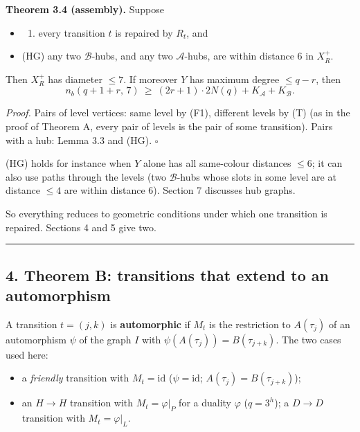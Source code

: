 \documentclass[
  11pt,
]{article}
\providecommand{\tightlist}{%
  \setlength{\itemsep}{0pt}\setlength{\parskip}{0pt}}
\begin{document}
\textbf{Theorem 3.4 (assembly).} Suppose

\begin{itemize}
\item
  \begin{enumerate}
  \def\labelenumi{(\Alph{enumi})}
  \setcounter{enumi}{19}
  \tightlist
  \item
    every transition \(t\) is repaired by \(R_t\), and
  \end{enumerate}
\item
  (HG) any two \(\mathcal B\)-hubs, and any two \(\mathcal A\)-hubs, are within distance 6 in \(X_R^+\).
\end{itemize}

Then \(X_R^+\) has diameter \(\le 7\). If moreover \(Y\) has maximum degree \(\le q-r\), then
\[n_b(q+1+r,\,7)\ \ge\ (2r+1)\cdot 2N(q) + K_{\mathcal A} + K_{\mathcal B}.\]

\emph{Proof.} Pairs of level vertices: same level by (F1), different levels by (T) (as in the proof of Theorem A, every
pair of levels is the pair of some transition). Pairs with a hub: Lemma 3.3 and (HG). \(\square\)

(HG) holds for instance when \(Y\) alone has all same-colour distances \(\le 6\); it can also use paths through the
levels (two \(\mathcal B\)-hubs whose slots in some level are at distance \(\le 4\) are within distance 6). Section 7
discusses hub graphs.

So everything reduces to geometric conditions under which one transition is repaired. Sections 4 and 5 give two.

\begin{center}\rule{0.5\linewidth}{0.5pt}\end{center}

\hypertarget{theorem-b-transitions-that-extend-to-an-automorphism}{%
\subsection{4. Theorem B: transitions that extend to an
automorphism}\label{theorem-b-transitions-that-extend-to-an-automorphism}}

A transition \(t = (j,k)\) is \textbf{automorphic} if \(M_t\) is the restriction to \(A(\tau_j)\) of an automorphism
\(\psi\) of the graph \(I\) with \(\psi(A(\tau_j)) = B(\tau_{j+k})\). The two cases used here:

\begin{itemize}
\tightlist
\item
  a \emph{friendly} transition with \(M_t = \mathrm{id}\) (\(\psi = \mathrm{id}\); \(A(\tau_j) = B(\tau_{j+k})\));
\item
  an \(H\to H\) transition with \(M_t = \varphi\vert_P\) for a duality \(\varphi\) (\(q = 3^h\)); a \(D\to D\)
  transition with \(M_t = \varphi\vert_L\).
\end{itemize}
\end{document}
